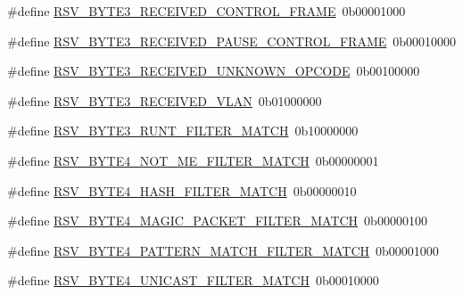 \begin{DoxyCompactItemize}
\item 
\#define \mbox{\hyperlink{group___receive_ga38e402fa239e391e46b28b5c6681dfe9}{R\+S\+V\+\_\+\+B\+Y\+T\+E3\+\_\+\+R\+E\+C\+E\+I\+V\+E\+D\+\_\+\+C\+O\+N\+T\+R\+O\+L\+\_\+\+F\+R\+A\+ME}}~0b00001000
\item 
\#define \mbox{\hyperlink{group___receive_ga79ecf389081d30616847cae6cb5b7a62}{R\+S\+V\+\_\+\+B\+Y\+T\+E3\+\_\+\+R\+E\+C\+E\+I\+V\+E\+D\+\_\+\+P\+A\+U\+S\+E\+\_\+\+C\+O\+N\+T\+R\+O\+L\+\_\+\+F\+R\+A\+ME}}~0b00010000
\item 
\#define \mbox{\hyperlink{group___receive_ga1d598b4ddbd78ad09795a0f02845c85f}{R\+S\+V\+\_\+\+B\+Y\+T\+E3\+\_\+\+R\+E\+C\+E\+I\+V\+E\+D\+\_\+\+U\+N\+K\+N\+O\+W\+N\+\_\+\+O\+P\+C\+O\+DE}}~0b00100000
\item 
\#define \mbox{\hyperlink{group___receive_gaa1c5e51e1fc7daa0180df5af3294177f}{R\+S\+V\+\_\+\+B\+Y\+T\+E3\+\_\+\+R\+E\+C\+E\+I\+V\+E\+D\+\_\+\+V\+L\+AN}}~0b01000000
\item 
\#define \mbox{\hyperlink{group___receive_gaf4ae3b272d5eb92f8d38f183846445b3}{R\+S\+V\+\_\+\+B\+Y\+T\+E3\+\_\+\+R\+U\+N\+T\+\_\+\+F\+I\+L\+T\+E\+R\+\_\+\+M\+A\+T\+CH}}~0b10000000
\item 
\#define \mbox{\hyperlink{group___receive_ga27160ef6ffdcaa803c8ca26cb1c95499}{R\+S\+V\+\_\+\+B\+Y\+T\+E4\+\_\+\+N\+O\+T\+\_\+\+M\+E\+\_\+\+F\+I\+L\+T\+E\+R\+\_\+\+M\+A\+T\+CH}}~0b00000001
\item 
\#define \mbox{\hyperlink{group___receive_ga68476e62976ec265592a312ba2aefab1}{R\+S\+V\+\_\+\+B\+Y\+T\+E4\+\_\+\+H\+A\+S\+H\+\_\+\+F\+I\+L\+T\+E\+R\+\_\+\+M\+A\+T\+CH}}~0b00000010
\item 
\#define \mbox{\hyperlink{group___receive_ga8fc9b8804e9cb35a7c8ae4b5bc5065c1}{R\+S\+V\+\_\+\+B\+Y\+T\+E4\+\_\+\+M\+A\+G\+I\+C\+\_\+\+P\+A\+C\+K\+E\+T\+\_\+\+F\+I\+L\+T\+E\+R\+\_\+\+M\+A\+T\+CH}}~0b00000100
\item 
\#define \mbox{\hyperlink{group___receive_ga81251d8615bd5ed24a75cc03a4803e3f}{R\+S\+V\+\_\+\+B\+Y\+T\+E4\+\_\+\+P\+A\+T\+T\+E\+R\+N\+\_\+\+M\+A\+T\+C\+H\+\_\+\+F\+I\+L\+T\+E\+R\+\_\+\+M\+A\+T\+CH}}~0b00001000
\item 
\#define \mbox{\hyperlink{group___receive_gab864c929aa2a7b2423d54ff554356355}{R\+S\+V\+\_\+\+B\+Y\+T\+E4\+\_\+\+U\+N\+I\+C\+A\+S\+T\+\_\+\+F\+I\+L\+T\+E\+R\+\_\+\+M\+A\+T\+CH}}~0b00010000
\end{DoxyCompactItemize}


